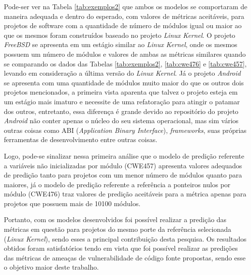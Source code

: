 Pode-ser ver na Tabela \ref{tab:exemplos2} que ambos os modelos se comportaram
de maneira adequada e dentro do esperado, com valores de métricas aceitáveis,
para projetos de software com a quantidade de número de módulos igual ou maior
ao que os mesmos foram construídos baseado no projeto \textit{Linux Kernel}. O
projeto \textit{FreeBSD} se apresenta em um estágio similar ao \textit{Linux
Kernel}, onde os mesmos possuem um número de módulos e valores de ambas as
métricas similares quando se comparando os dados das Tabelas
\ref{tab:exemplos2}, \ref{tab:cwe476} e \ref{tab:cwe457}, levando em
consideração a última versão do \textit{Linux Kernel}. Já o projeto
\textit{Android} se apresenta com uma quantidade de módulos muito maior do que
os outros dois projetos mencionados, a primeira vista aparenta que talvez o
projeto esteja em um estágio mais imaturo e necessite de uma refatoração para
atingir o patamar dos outros, entretanto, essa diferença é grande devido ao
repositório do projeto \textit{Android} não conter apenas o núcleo do seu
sistema operacional, mas sim vários outras coisas como ABI (\textit{Application
Binary Interface}), \textit{frameworks}, suas próprias ferramentas de
desenvolvimento entre outras coisas. 

Logo, pode-se sinalizar nessa primeira análise que o modelo de predição
referente a variáveis não inicializadas por módulo (CWE457) apresenta valores
adequados de predição tanto para projetos com um menor número de módulos quanto
para maiores, já o modelo de predição referente a referência a ponteiros nulos
por módulo (CWE476) traz valores de predição aceitáveis para a métrica apenas
para projetos que possuem mais de 10100 módulos. 

Portanto, com os modelos desenvolvidos foi possível realizar a predição das
métricas em questão para projetos do mesmo porte da referência selecionada
(\textit{Linux Kernel}), sendo esses a principal contribuição desta pesquisa. Os
resultados obtidos foram satisfatórios tendo em vista que foi possível realizar
as predições das métricas de ameaças de vulnerabilidade de código fonte
propostas, sendo esse o objetivo maior deste trabalho.

